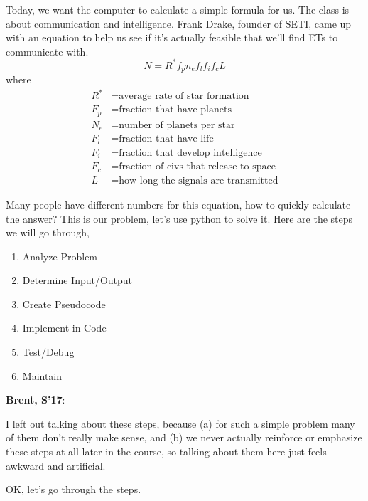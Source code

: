 \documentclass{article}
\newenvironment{reflect}[1]
{
  \noindent
  \begin{lrbox}{\reflectbox}
    \begin{minipage}[t]{\textwidth}
      \textbf{#1}:
}{
    \end{minipage}
  \end{lrbox}
  \fbox{\usebox{\reflectbox}}
}
\begin{document}
Today, we want the computer to calculate a simple formula for us.  The
class is about communication and intelligence.  Frank Drake, founder
of SETI, came up with an equation to help us see if it's actually
feasible that we'll find ETs to communicate with.
\[ N = R^* f_p n_e f_l f_i f_c L \]
where
\begin{align*}
R^* &= \text{average rate of star formation} \\
F_p &= \text{fraction that have planets} \\
N_e &= \text{number of planets per star} \\
F_l &= \text{fraction that have life} \\
F_i &= \text{fraction that develop intelligence} \\
F_c &= \text{fraction of civs that release to space} \\
L &= \text{how long the signals are transmitted}
\end{align*}

Many people have different numbers for this equation, how to quickly
calculate the answer?  This is our problem, let's use python to solve
it.  Here are the steps we will go through,

\begin{enumerate}
\item Analyze Problem
\item Determine Input/Output
\item Create Pseudocode
\item Implement in Code
\item Test/Debug
\item Maintain
\end{enumerate}

\begin{reflect}{Brent, S'17}
  I left out talking about these steps, because (a) for such a simple
  problem many of them don't really make sense, and (b) we never
  actually reinforce or emphasize these steps at all later in the
  course, so talking about them here just feels awkward and artificial.
\end{reflect}

OK, let's go through the steps.
\end{document}

